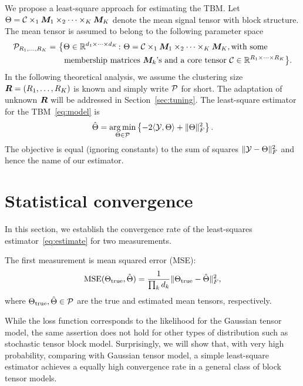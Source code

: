 \documentclass{article}
\begin{document}
We propose a least-square approach for estimating the TBM. Let $\Theta=\mathcal{C}\times_1\boldsymbol{M}_1\times_2\cdots\times_K\boldsymbol{M}_K$ denote the mean signal tensor with block structure. The mean tensor is assumed to belong to the following parameter space
\begin{align}\label{eq:space}
\mathcal{P}_{R_1,\ldots,R_K}=&\ \big\{ \Theta\in\mathbb{R}^{d_1\times \cdots \times d_K}\colon \Theta=\mathcal{C}\times_1\boldsymbol{M}_1\times_2\cdots\times_K\boldsymbol{M}_K, \text{with some}\notag \\
 &\quad \text{membership matrices $\boldsymbol{M}_k$'s and a core tensor $\mathcal{C}\in\mathbb{R}^{R_1\times \cdots \times R_K}$}\big\}\notag .
\end{align}
In the following theoretical analysis, we assume the clustering size $\bm{R}=(R_1,\ldots,R_K)$ is known and simply write $\mathcal{P}$ for short. The adaptation of unknown $\bm{R}$ will be addressed in Section~\ref{sec:tuning}. The least-square estimator for the TBM~\eqref{eq:model} is
\begin{equation}\label{eq:estimate}
\hat \Theta=\operatorname*{arg\,min}_{\Theta\in\mathcal{P}}\left\{ -2\langle \mathcal{Y},\Theta\rangle + \lVert\Theta\rVert_F^2\right\}.
\end{equation}
The objective is equal (ignoring constants) to the sum of squares $\lVert\mathcal{Y}-\Theta\rVert_F^2$ and hence the name of our estimator. 

\section{Statistical convergence}\label{sec:theory}
In this section, we establish the convergence rate of the least-squares estimator~\eqref{eq:estimate} for two measurements.

The first measurement is mean squared error (MSE):
\begin{equation} \label{eq:MSE}
\text{MSE}(\Theta_{\text{true}},\hat \Theta)={1\over \prod_k d_k}\lVert\Theta_{\text{true}}-\hat \Theta\rVert_F^2,
\end{equation}
where $\Theta_{\text{true}}, \hat \Theta\in\mathcal{P}$ are the true and estimated mean tensors, respectively.



While the loss function corresponds to the likelihood for the Gaussian tensor model, the same assertion does not hold for other types of distribution such as stochastic tensor block model. Surprisingly, we will show that, with very high probability, comparing with Gaussian tensor model, a simple least-square estimator achieves a equally high convergence rate in a general class of block tensor models.  
\end{document}
